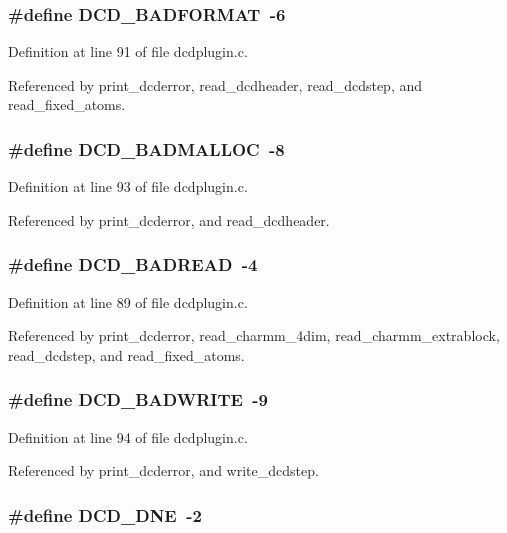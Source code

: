 \subsubsection{\setlength{\rightskip}{0pt plus 5cm}\#define DCD\_\-BADFORMAT\ -6}\label{dcdplugin_8c_a10}




Definition at line 91 of file dcdplugin.c.

Referenced by print\_\-dcderror, read\_\-dcdheader, read\_\-dcdstep, and read\_\-fixed\_\-atoms.
\subsubsection{\setlength{\rightskip}{0pt plus 5cm}\#define DCD\_\-BADMALLOC\ -8}\label{dcdplugin_8c_a12}




Definition at line 93 of file dcdplugin.c.

Referenced by print\_\-dcderror, and read\_\-dcdheader.
\subsubsection{\setlength{\rightskip}{0pt plus 5cm}\#define DCD\_\-BADREAD\ -4}\label{dcdplugin_8c_a8}




Definition at line 89 of file dcdplugin.c.

Referenced by print\_\-dcderror, read\_\-charmm\_\-4dim, read\_\-charmm\_\-extrablock, read\_\-dcdstep, and read\_\-fixed\_\-atoms.
\subsubsection{\setlength{\rightskip}{0pt plus 5cm}\#define DCD\_\-BADWRITE\ -9}\label{dcdplugin_8c_a13}




Definition at line 94 of file dcdplugin.c.

Referenced by print\_\-dcderror, and write\_\-dcdstep.
\subsubsection{\setlength{\rightskip}{0pt plus 5cm}\#define DCD\_\-DNE\ -2}\label{dcdplugin_8c_a6}




